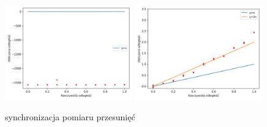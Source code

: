 \begin{frame}
    \begin{figure}
        \centering
        \includegraphics[width=0.49\textwidth]{../pics/time_deltas_dist/dists.png}
        \includegraphics[width=0.49\textwidth]{../pics/time_deltas_dist/dists_close.png}
        \caption{synchronizacja pomiaru przesunięć}
    \end{figure}
\end{frame}